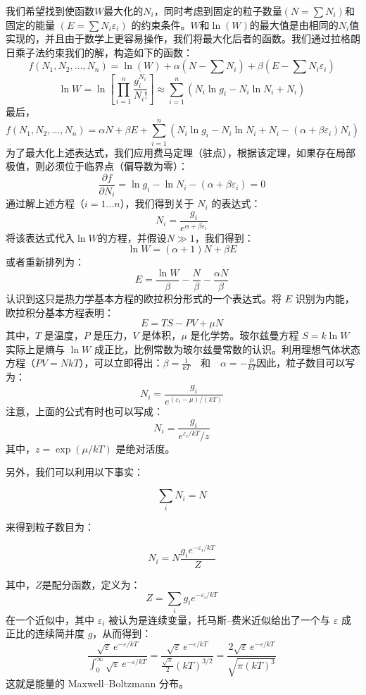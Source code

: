 我们希望找到使函数\(W\)最大化的\(N_i\)，同时考虑到固定的粒子数量\((N = \sum N_i)\)和固定的能量 \((E = \sum N_i \varepsilon_i)\) 的约束条件。\(W\)和\(\ln(W)\)的最大值是由相同的\(N_i\)值实现的，并且由于数学上更容易操作，我们将最大化后者的函数。我们通过拉格朗日乘子法约束我们的解，构造如下的函数：
\[
f(N_1, N_2, \dots, N_n) = \ln(W) + \alpha (N - \sum N_i) + \beta (E - \sum N_i \varepsilon_i)~
\]
\[
\ln W = \ln \left[\prod_{i=1}^{n} \frac{g_i^{N_i}}{N_i!}\right] \approx \sum_{i=1}^{n} \left(N_i \ln g_i - N_i \ln N_i + N_i \right)~
\]
最后，
\[
f(N_1, N_2, \dots, N_n) = \alpha N + \beta E + \sum_{i=1}^{n} \left( N_i \ln g_i - N_i \ln N_i + N_i - (\alpha + \beta \varepsilon_i) N_i \right)~
\]
为了最大化上述表达式，我们应用费马定理（驻点），根据该定理，如果存在局部极值，则必须位于临界点（偏导数为零）：
\[
\frac{\partial f}{\partial N_i} = \ln g_i - \ln N_i - (\alpha + \beta \varepsilon_i) = 0~
\]
通过解上述方程（\(i = 1 \ldots n\)），我们得到关于 \(N_i\) 的表达式：
\[
N_i = \frac{g_i}{e^{\alpha + \beta \varepsilon_i}}~
\]
将该表达式代入\(\ln W\)的方程，并假设\(N \gg 1\)，我们得到：
\[
\ln W = (\alpha + 1)N + \beta E~
\]
或者重新排列为：
\[
E = \frac{\ln W}{\beta} - \frac{N}{\beta} - \frac{\alpha N}{\beta}~
\]
认识到这只是热力学基本方程的欧拉积分形式的一个表达式。将 \(E\) 识别为内能，欧拉积分基本方程表明：
\[
E = TS - PV + \mu N~
\]
其中，\(T\) 是温度，\(P\) 是压力，\(V\) 是体积，\(\mu\) 是化学势。玻尔兹曼方程 \(S = k \ln W\) 实际上是熵与 \(\ln W\) 成正比，比例常数为玻尔兹曼常数的认识。利用理想气体状态方程（\(PV = NkT\)），可以立即得出：\(
\beta = \frac{1}{kT} \quad \text{和} \quad \alpha = -\frac{\mu}{kT}\)因此，粒子数目可以写为：
\[
N_i = \frac{g_i}{e^{(\varepsilon_i - \mu) / (kT)}}~
\]
注意，上面的公式有时也可以写成：
\[
N_i = \frac{g_i}{e^{\varepsilon_i / kT} / z}~
\]
其中，\(z = \exp(\mu / kT)\) 是绝对活度。

另外，我们可以利用以下事实：

\[
\sum_i N_i = N~
\]

来得到粒子数目为：

\[
N_i = N \frac{g_i e^{-\varepsilon_i / kT}}{Z}~
\]

其中，\(Z\)是配分函数，定义为：
\[Z = \sum_i g_i e^{-\varepsilon_i / kT}~\]
在一个近似中，其中 \(\varepsilon_i\) 被认为是连续变量，托马斯–费米近似给出了一个与 \(\varepsilon\) 成正比的连续简并度 \(g\)，从而得到：
\[
\frac{{\sqrt {\varepsilon }} \, e^{-\varepsilon / kT}}{\int_0^\infty {\sqrt {\varepsilon }} \, e^{-\varepsilon / kT}} = \frac{{\sqrt {\varepsilon }} \, e^{-\varepsilon / kT}}{\frac{{\sqrt {\pi}}}{2} (kT)^{3/2}} = \frac{{2 \sqrt {\varepsilon }} \, e^{-\varepsilon / kT}}{\sqrt {\pi (kT)^3}}~
\]
这就是能量的 Maxwell–Boltzmann 分布。